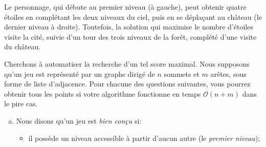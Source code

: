 \documentclass{article}
\renewcommand{\O}{\mathcal{O}}                   %
\begin{document}
\begin{question}
\begin{center}
    \vspace*{-12pt}
  \end{center}

  Le personnage, qui débute au premier niveau (à gauche), peut obtenir
  quatre étoiles en complétant les deux niveaux du ciel, puis en se
  déplaçant au château (le dernier niveau à droite). Toutefois, la
  solution qui maximise le nombre d'étoiles visite la cité, suivie
  d'un tour des trois niveaux de la forêt, complété d'une visite du
  château.

  Cherchons à automatiser la recherche d'un tel score maximal. Nous
  supposons qu'un jeu est représenté par un graphe dirigé de $n$
  sommets et $m$ arêtes, sous forme de liste d'adjacence. Pour chacune
  des questions suivantes, vous pourrez obtenir tous les points si
  votre algorithme fonctionne en temps $\O(n + m)$ dans le pire cas.
  
  \begin{enumerate}[(a)]
    \setlength\itemsep{10pt}
        
  \item Nous  disons qu'un jeu est \emph{bien
    conçu} si:\smallskip

    \begin{itemize}
    \item il possède un niveau accessible à partir d'aucun autre (le
      \emph{premier niveau});


\end{itemize}
\end{enumerate}
\end{question}
\end{document}
